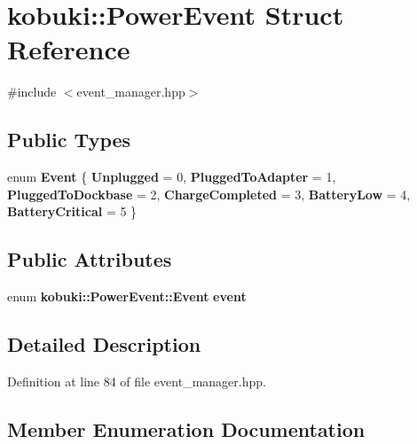 \section{kobuki\-:\-:\-Power\-Event \-Struct \-Reference}
\label{structkobuki_1_1PowerEvent}


{\ttfamily \#include $<$event\-\_\-manager.\-hpp$>$}

\subsection*{\-Public \-Types}
\begin{DoxyCompactItemize}
\item 
enum {\bf \-Event} \{ \*
{\bf \-Unplugged} =  0, 
{\bf \-Plugged\-To\-Adapter} =  1, 
{\bf \-Plugged\-To\-Dockbase} =  2, 
{\bf \-Charge\-Completed} =  3, 
\*
{\bf \-Battery\-Low} =  4, 
{\bf \-Battery\-Critical} =  5
 \}
\end{DoxyCompactItemize}
\subsection*{\-Public \-Attributes}
\begin{DoxyCompactItemize}
\item 
enum {\bf kobuki\-::\-Power\-Event\-::\-Event} {\bf event}
\end{DoxyCompactItemize}


\subsection{\-Detailed \-Description}


\-Definition at line 84 of file event\-\_\-manager.\-hpp.



\subsection{\-Member \-Enumeration \-Documentation}
